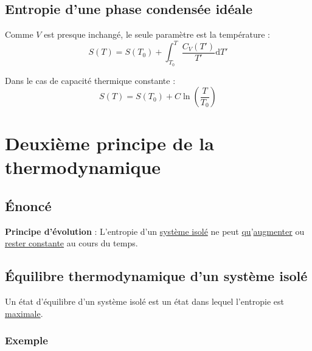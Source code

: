 


\subsection{Entropie d'une phase condensée idéale} %
\label{sub:Entropie d'une phase condensée idéale}
Comme $V$ est presque inchangé,  le seule paramètre est la température : 
\begin{equation}
  S(T) = S(T_0) + \int_{T_0}^{T} \frac{C_V(T')}{T'}  \mathrm{d}T '
\end{equation}

Dans le cas de capacité thermique constante :
\begin{equation}
  S(T) = S(T_0) + C \ln \left( \frac{T}{T_0}  \right)
\end{equation}

\newpage
\section{Deuxième principe de la thermodynamique} %
\label{sec:Deuxième principe de la thermodynamique}

\subsection{Énoncé} %
\label{sub:Énoncé}


\textbf{Principe d'évolution} : L'entropie d'un \underline{système isolé} ne peut \underline{qu}'\underline{augmenter} ou \underline{rester constante} au cours du temps.

\subsection{Équilibre thermodynamique d'un système isolé} %
\label{sub:Équilibre thermodynamique d'un système isolé}

Un état d'équilibre d'un système isolé est un état dans lequel l'entropie est \underline{maximale}.

\subsubsection{Exemple} %
\label{sec:Exemple}

